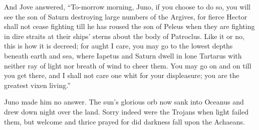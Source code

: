 And Jove answered, “To-morrow morning, Juno, if you choose to do so, you
will see the son of Saturn destroying large numbers of the Argives, for
fierce Hector shall not cease fighting till he has roused the son of
Peleus when they are fighting in dire straits at their ships’ sterns about
the body of Patroclus. Like it or no, this is how it is decreed; for aught
I care, you may go to the lowest depths beneath earth and sea, where
Iapetus and Saturn dwell in lone Tartarus with neither ray of light nor
breath of wind to cheer them. You may go on and on till you get there, and
I shall not care one whit for your displeasure; you are the greatest vixen
living.”

Juno made him no answer. The sun’s glorious orb now sank into Oceanus and
drew down night over the land. Sorry indeed were the Trojans when light
failed them, but welcome and thrice prayed for did darkness fall upon the
Achaeans.

